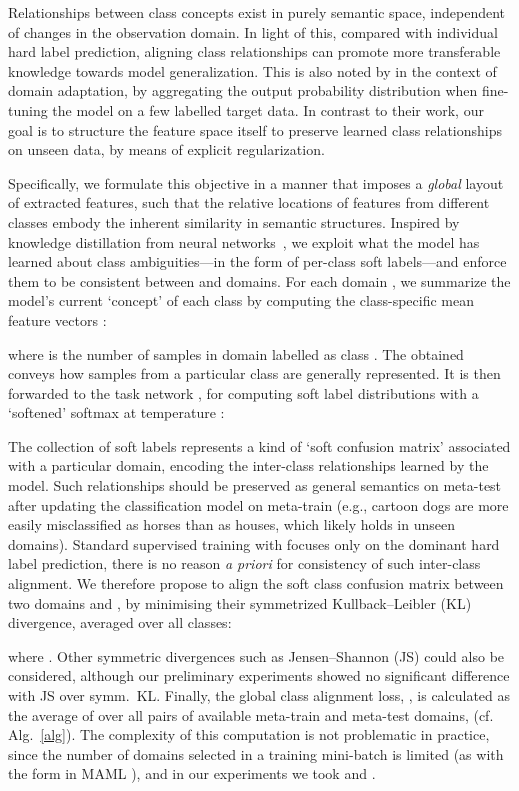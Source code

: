 \documentclass{article}
\begin{document}
Relationships between class concepts exist in purely semantic space, independent of changes in the observation domain. In light of this, compared with individual hard label prediction,
aligning class relationships can promote more transferable knowledge towards model generalization. This is also noted by \citet{tzeng2015simultaneous} in the context of domain adaptation, by aggregating the output probability distribution when fine-tuning the model on a few labelled target data. In contrast to their work, our goal is to structure the feature space itself to preserve learned class relationships on unseen data, by means of explicit regularization.


Specifically, we formulate this objective in a manner that imposes a \emph{global} layout of extracted features, such that the relative locations of features from different classes embody the inherent similarity in semantic structures. Inspired by knowledge distillation from neural networks~\citep{hinton2014distilling}, we exploit what the model has learned about class ambiguities---in the form of per-class soft labels---and enforce them to be consistent between  and  domains.
For each domain , we summarize the model's current `concept' of each class  by computing the class-specific mean feature vectors :

where  is the number of samples in domain  labelled as class . 
The obtained  conveys how samples from a particular class are generally represented. It is then forwarded to the task network , for computing soft label distributions  with a `softened' softmax at temperature  \citep{hinton2014distilling}:

The collection of soft labels  represents a kind of `soft confusion matrix' associated with a particular domain, encoding the inter-class relationships learned by the model.
Such relationships should be preserved as general semantics on meta-test after updating the classification model on meta-train (e.g., cartoon dogs are more easily misclassified as horses than as houses, which likely holds in unseen domains).
Standard supervised training with  focuses only on the dominant hard label prediction, there is no reason \textit{a priori} for consistency of such inter-class alignment.
We therefore propose to align the soft class confusion matrix between two domains  and , by minimising their symmetrized Kullback--Leibler (KL) divergence, averaged over all  classes:

where . Other symmetric divergences such as Jensen--Shannon (JS) could also be considered, although our preliminary experiments showed no significant difference with JS over symm.\ KL. Finally, the global class alignment loss, , is calculated as the average of  over all pairs of available meta-train and meta-test domains,  (cf. Alg.~\ref{alg}).
The complexity of this computation is not problematic in practice, since the number of domains selected in a training mini-batch is limited (as with the form in MAML \citep{finn2017model}), and in our experiments we took  and .
\end{document}

